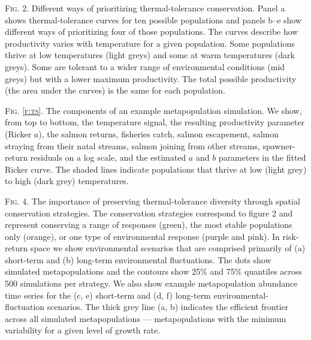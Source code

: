 \documentclass[12pt,english]{article}
\begin{document}
\begin{spacing}{1.9}
\bigskip
\noindent
\textsc{Fig. 2}. Different ways of prioritizing thermal-tolerance conservation. Panel a shows thermal-tolerance curves for ten possible populations and panels b--e show different ways of prioritizing four of those populations. The curves describe how productivity varies with temperature for a given population. Some populations thrive at low temperatures (light greys) and some at warm temperatures (dark greys). Some are tolerant to a wider range of environmental conditions (mid greys) but with a lower maximum productivity. The total possible productivity (the area under the curves) is the same for each population.


\bigskip
\noindent
\textsc{Fig. \ref{f:ts}}. The components of an example metapopulation simulation. We show, from top to bottom, the temperature signal, the resulting productivity parameter (Ricker $a$), the salmon returns, fisheries catch, salmon escapement, salmon straying from their natal streams, salmon joining from other streams, spawner-return residuals on a log scale, and the estimated $a$ and $b$ parameters in the fitted Ricker curve. The shaded lines indicate populations that thrive at low (light grey) to high (dark grey) temperatures.


\bigskip
\noindent
\textsc{Fig. 4}. The importance of preserving thermal-tolerance diversity through spatial conservation strategies. The conservation strategies correspond to figure 2 and represent conserving a range of responses (green), the most stable populations only (orange), or one type of environmental response (purple and pink). In risk-return space we show environmental scenarios that are comprised primarily of (a) short-term and (b) long-term environmental fluctuations. The dots show simulated metapopulations and the contours show 25\% and 75\% quantiles across 500 simulations per strategy. We also show example metapopulation abundance time series for the (c, e) short-term and (d, f) long-term environmental-fluctuation scenarios. The thick grey line (a, b) indicates the efficient frontier across all simulated metapopulations --- metapopulations with the minimum variability for a given level of growth rate.


\end{spacing}
\end{document}
